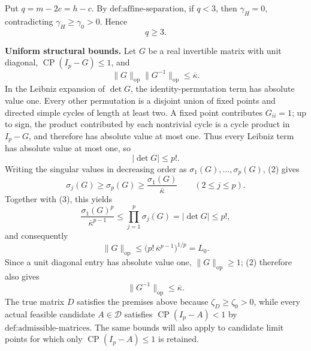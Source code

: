 Put \(q=m-2c=h-c\). By \(\text{def:affine-separation}\), if \(q<3\), then \(\gamma_H=0\), contradicting \(\gamma_H\geq\gamma_0>0\). Hence
\[
q\geq3.
\tag{1}
\]

\textbf{Uniform structural bounds.}
Let \(G\) be a real invertible matrix with unit diagonal, \(\operatorname{CP}(I_p-G)\leq1\), and
\[
\|G\|_{\mathrm{op}}\|G^{-1}\|_{\mathrm{op}}
\leq\overline\kappa.
\tag{2}
\]
In the Leibniz expansion of \(\det G\), the identity-permutation term has absolute value one. Every other permutation is a disjoint union of fixed points and directed simple cycles of length at least two. A fixed point contributes \(G_{ii}=1\); up to sign, the product contributed by each nontrivial cycle is a cycle product in \(I_p-G\), and therefore has absolute value at most one. Thus every Leibniz term has absolute value at most one, so
\[
|\det G|\leq p!.
\tag{3}
\]
Writing the singular values in decreasing order as \(\sigma_1(G),\ldots,\sigma_p(G)\), (2) gives
\[
\sigma_j(G)\geq\sigma_p(G)
\geq\frac{\sigma_1(G)}{\overline\kappa}
\qquad(2\leq j\leq p).
\]
Together with (3), this yields
\[
\frac{\sigma_1(G)^p}{\overline\kappa^{p-1}}
\leq\prod_{j=1}^p\sigma_j(G)
=|\det G|
\leq p!,
\]
and consequently
\[
\|G\|_{\mathrm{op}}
\leq\bigl(p!\,\overline\kappa^{p-1}\bigr)^{1/p}
=L_0.
\tag{4}
\]
Since a unit diagonal entry has absolute value one, \(\|G\|_{\mathrm{op}}\geq1\); (2) therefore also gives
\[
\|G^{-1}\|_{\mathrm{op}}\leq\overline\kappa.
\tag{5}
\]
The true matrix \(D\) satisfies the premises above because \(\zeta_D\geq\zeta_0>0\), while every actual feasible candidate \(A\in\mathcal D\) satisfies \(\operatorname{CP}(I_p-A)<1\) by \(\text{def:admissible-matrices}\). The same bounds will also apply to candidate limit points for which only \(\operatorname{CP}(I_p-A)\leq1\) is retained.


